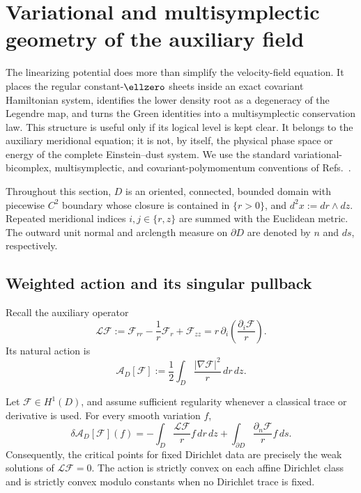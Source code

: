 \section{Variational and multisymplectic geometry of the auxiliary field}
\label{sec:variational-multisymplectic}

The linearizing potential does more than simplify the velocity-field
equation. It places the regular constant-$\ellzero$ sheets inside an exact
covariant Hamiltonian system, identifies the lower density root as a
degeneracy of the Legendre map, and turns the Green identities into a
multisymplectic conservation law. This structure is useful only if its
logical level is kept clear. It belongs to the auxiliary meridional equation;
it is not, by itself, the physical phase space or energy of the complete
Einstein--dust system. We use the standard variational-bicomplex,
multisymplectic, and covariant-polymomentum conventions of
Refs.~\cite{Anderson1992VariationalBicomplex,MarsdenPatrickShkoller1998CMP,
Kanatchikov1998RepMathPhys}.

Throughout this section, $D$ is an oriented, connected, bounded domain with piecewise
$C^2$ boundary whose closure is contained in $\{r>0\}$, and
$d^2x:=dr\wedge dz$. Repeated meridional indices $i,j\in\{r,z\}$ are summed
with the Euclidean metric. The outward unit normal and arclength measure on
$\partial D$ are denoted by $n$ and $ds$, respectively.

\subsection{Weighted action and its singular pullback}

Recall the auxiliary operator
\begin{equation}
\mathcal L\mathcal F
:=\mathcal F_{rr}-\frac{1}{r}\mathcal F_r+\mathcal F_{zz}
=r\,\partial_i\!\left(\frac{\partial_i\mathcal F}{r}\right).
\label{eq:ms-weighted-operator}
\end{equation}
Its natural action is
\begin{equation}
\mathcal A_D[\mathcal F]
:=\frac12\int_D\frac{|\nabla\mathcal F|^2}{r}\,dr\,dz.
\label{eq:ms-weighted-action}
\end{equation}

\begin{proposition}
\label{prop:ms-weighted-variation}
Let $\mathcal F\in H^1(D)$, and assume sufficient regularity whenever a
classical trace or derivative is used. For every smooth variation $f$,
\begin{equation}
\delta\mathcal A_D[\mathcal F](f)
=-\int_D\frac{\mathcal L\mathcal F}{r}f\,dr\,dz
+\int_{\partial D}\frac{\partial_n\mathcal F}{r}f\,ds.
\label{eq:ms-first-variation}
\end{equation}
Consequently, the critical points for fixed Dirichlet data are precisely the
weak solutions of $\mathcal L\mathcal F=0$. The action is strictly convex on
each affine Dirichlet class and is strictly convex modulo constants when no
Dirichlet trace is fixed.
\end{proposition}

